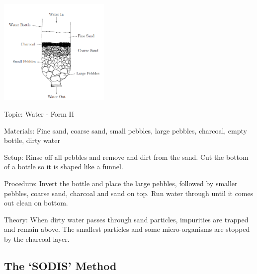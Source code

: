 \begin{multicols}{2}
\begin{center}
\includegraphics[width=0.4\textwidth]{./img/water-filter.png}
\end{center}

\begin{description*}
\item[Topic:]{Water - Form II}
\item[Materials:]{Fine sand, coarse sand, small pebbles, large pebbles, charcoal, empty bottle, dirty water}
\item[Setup:]{Rinse off all pebbles and remove and dirt from the sand. Cut the bottom of a bottle so it is shaped like a funnel.}
\item[Procedure:]{Invert the bottle and place the large pebbles, followed by smaller pebbles, coarse sand, charcoal and sand on top. Run water through until it comes out clean on bottom.}
\item[Theory:]{When dirty water passes through sand particles, impurities are trapped and
remain above. The smallest particles and some micro-organisms are stopped
by the charcoal layer.}
\end{description*}

\subsection{The `SODIS' Method} %



\end{multicols}
